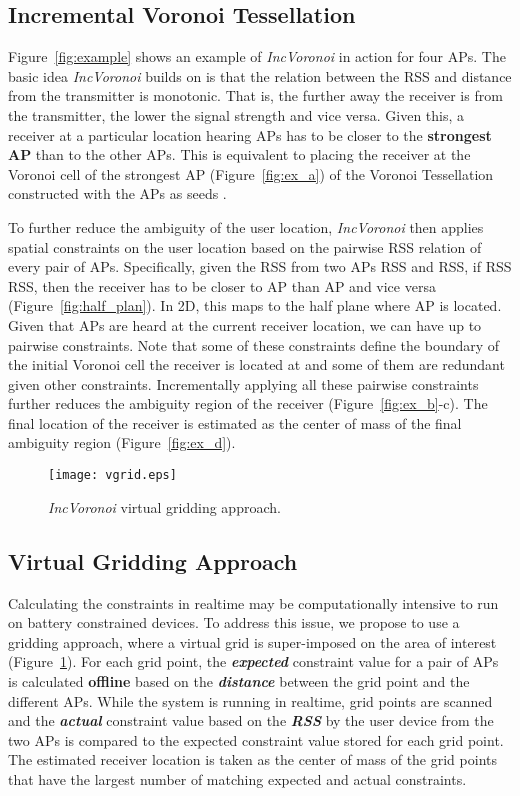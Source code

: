 \documentclass[conference]{IEEEtran}
\def \sys {\textit{IncVoronoi}}
\begin{document}
\subsection{Incremental Voronoi Tessellation}
\label{sec:basic_vor}
Figure~\ref{fig:example} shows an example of \sys{} in action for four APs. The basic idea \sys{} builds on is that the relation between the RSS and distance from the transmitter is monotonic. That is, the further away the receiver is from the transmitter, the lower the signal strength and vice versa. Given this, a receiver at a particular location hearing  APs has to be closer to the \textbf{strongest AP} than to the other APs. This is equivalent to placing the receiver at the Voronoi cell of the strongest AP (Figure~\ref{fig:ex_a}) of the Voronoi Tessellation constructed with the APs as seeds \cite{voronoi}.

To further reduce the ambiguity of the user location, \sys{} then applies spatial constraints on the user location based on the pairwise RSS relation of every pair of APs. 
Specifically, given the RSS from two APs RSS and RSS, if RSS  RSS, then the receiver has to be closer to AP than AP and vice versa (Figure~\ref{fig:half_plan}). In 2D, this maps to the half plane where AP is located. Given that  APs are heard at the current receiver location, we can have up to  pairwise constraints. Note that some of these constraints define the boundary of the initial Voronoi cell the receiver is located at and some of them are redundant given other constraints.  Incrementally applying all these pairwise constraints further reduces the ambiguity region of the receiver (Figure~\ref{fig:ex_b}-c). The final location of the receiver is estimated as the center of mass of the final ambiguity region (Figure~\ref{fig:ex_d}).
\begin{figure}[!t]
\centering
\texttt{[image: vgrid.eps]}
\caption{\sys{} virtual gridding approach.
} 
\label{fig:vgrid_ill}
\end{figure}
\subsection{Virtual Gridding Approach}
\label{sec:vgrid}
Calculating the constraints in realtime may be computationally intensive to run on battery constrained devices. 
 To address this issue, we propose to use a gridding approach, where a virtual grid is super-imposed on the area of interest (Figure~\ref{fig:vgrid_ill}). For each grid point, the \textbf{\emph{expected}} constraint value for a pair of APs is calculated \textbf{offline} based on the \textbf{\emph{distance}} between the grid point and the different APs. While the system is running in realtime, grid points are scanned and the \emph{\textbf{actual}} constraint value based on the \textbf{\emph{RSS}} by the user device from the two APs is compared to the expected constraint value stored for each grid point. The estimated receiver location is taken as the center of mass of the grid points that have the largest number of matching expected and actual constraints.
\end{document}
